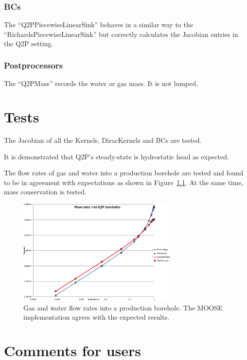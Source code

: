 \documentclass[]{scrreprt}
\begin{document}
\subsection{BCs}

The ``Q2PPiecewiseLinearSink'' behaves in a similar way to the
``RichardsPiecewiseLinearSink'' but correctly calculates the Jacobian
entries in the Q2P setting.


\subsection{Postprocessors}

The ``Q2PMass'' records the water or gas mass.  It is not lumped.



\chapter{Tests}

The Jacobian of all the Kernels, DiracKernels and BCs are tested.

It is demonstrated that Q2P's steady-state is hydrostatic head as
expected.

The flow rates of gas and water into a production borehole are tested
and found to be in agreement with expectations as shown in
Figure~\ref{bh.fig}.  At the same time, mass conservation is tested.

\begin{figure}[htb]
\centering
\includegraphics[width=8cm]{bh.eps}
\caption{Gas and water flow rates into a production borehole.  The
  MOOSE implementation agrees with the expected results.}
\label{bh.fig}
\end{figure}




\chapter{Comments for users}
\end{document}

